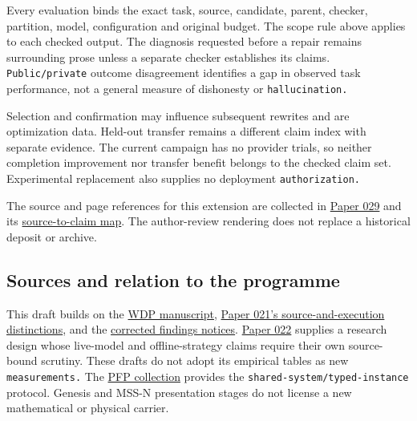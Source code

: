 \documentclass[
  11pt,
]{article}
\begin{document}
Every evaluation binds the exact task, source, candidate, parent,
checker, partition, model, configuration and original budget. The scope
rule above applies to each checked output. The diagnosis requested
before a repair remains surrounding prose unless a separate checker
establishes its claims. \nolinkurl{Public/private} outcome disagreement
identifies a gap in observed task performance, not a general measure of
dishonesty or \nolinkurl{hallucination.}

Selection and confirmation may influence subsequent rewrites and are
optimization data. Held-out transfer remains a different claim index
with separate evidence. The current campaign has no provider trials, so
neither completion improvement nor transfer benefit belongs to the
checked claim set. Experimental replacement also supplies no deployment
\nolinkurl{authorization.}

The source and page references for this extension are collected in
\href{../029/paper.pdf}{Paper 029} and its
\href{../029/docs/source_to_claim_map.md}{source-to-claim map}. The
author-review rendering does not replace a historical deposit or
archive.

\subsection{Sources and relation to the
programme}\label{sources-and-relation-to-the-programme}

This draft builds on the
\href{https://github.com/dbccpage/the_symbol_game/blob/59dde95a7860063c25d75db37f40af556e9f28ee/atlas/coda_atlas/F004_papers/001_finite_obstruction_calculus/000_witnessed_difference_programme/witnessed_difference_programme.md}{WDP
manuscript},
\href{https://github.com/dbccpage/the_symbol_game/blob/59dde95a7860063c25d75db37f40af556e9f28ee/atlas/coda_atlas/F004_papers/015_pfp/021_recreated_demos_and_proposal_fidelity_evidence/paper.md}{Paper
021's source-and-execution distinctions}, and the
\href{https://github.com/dbccpage/the_symbol_game/blob/59dde95a7860063c25d75db37f40af556e9f28ee/atlas/coda_atlas/F004_papers/015_pfp/symbol_game_challenge_and_demos_findings/README.md}{corrected
findings notices}.
\href{https://github.com/dbccpage/the_symbol_game/blob/59dde95a7860063c25d75db37f40af556e9f28ee/atlas/coda_atlas/F004_papers/015_pfp/022_pfp_frontier_research/paper.md}{Paper
022} supplies a research design whose live-model and offline-strategy
claims require their own source-bound scrutiny. These drafts do not
adopt its empirical tables as new \nolinkurl{measurements.} The
\href{https://github.com/dbccpage/the_symbol_game/blob/59dde95a7860063c25d75db37f40af556e9f28ee/atlas/coda_atlas/F004_papers/015_pfp/README.md}{PFP
collection} provides the \nolinkurl{shared-system/typed-instance}
protocol. Genesis and MSS-N presentation stages do not license a new
mathematical or physical carrier.
\end{document}
